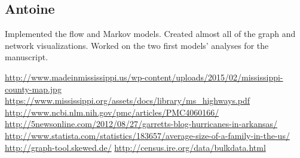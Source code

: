 \documentclass[titlepage]{article}
\begin{document}
\subsection*{Antoine}
Implemented the flow and Markov models. Created almost all of the graph and network visualizations. Worked on the two first models' analyses for the manuscript.

  \begin{thebibliography}{9}
      \url{http://www.madeinmississippi.us/wp-content/uploads/2015/02/mississippi-county-map.jpg}
      \url{https://www.mississippi.org/assets/docs/library/ms_highways.pdf}
      \url{http://www.ncbi.nlm.nih.gov/pmc/articles/PMC4060166/}
      \url{http://5newsonline.com/2012/08/27/garretts-blog-hurricanes-in-arkansas/}
      \url{http://www.statista.com/statistics/183657/average-size-of-a-family-in-the-us/}
      \url{http://graph-tool.skewed.de/}
      \url{http://census.ire.org/data/bulkdata.html}
  \end{thebibliography}






















\end{document}
